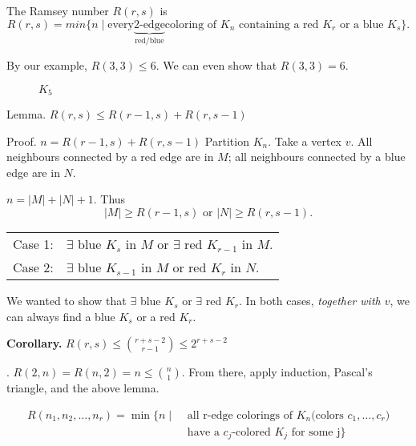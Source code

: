 
\begin{definition}
The Ramsey number $R(r,s)$ is
\[
  R(r,s) =
    min \{n\mid \text{every} \underbrace{\text{2-edge}}_{\text{red/blue}} 
    \text{coloring of $K_n$ containing a red $K_r$ or a blue $K_s$}\}.
\]
\end{definition}

By our example, $R(3,3) ≤ 6$. We can even show that $R(3,3) = 6$.

\begin{figure}[htb]
  \centering
  \caption{$K_5$}
\end{figure}

Lemma. $R(r,s) ≤ R(r-1, s) + R(r, s-1)$

Proof. $n = R(r-1, s) + R(r, s-1)$
Partition $K_n$. Take a vertex $v$. All neighbours connected by a red edge are in $M$; all neighbours connected by a blue edge are in $N$.

$n = |M|+|N|+1$. Thus
\[
  |M| ≥ R(r-1, s) \text{ or } |N| ≥ R(r, s-1).
\]

\begin{tabular}{ll}
  Case 1: & $\exists$ blue $K_s$ in $M$ or $\exists$ red $K_{r-1}$ in $M$. \\
  Case 2: & $\exists$ blue $K_{s-1}$ in $M$ or red $K_r$ in $N$.
\end{tabular}

We wanted to show that $\exists$ blue $K_s$ or $\exists$ red $K_r$.
In both cases, \emph{together with $v$}, we can always find a blue $K_s$ or a red $K_r$.

\textbf{Corollary.} $R(r,s) ≤ {r+s-2 \choose r-1} ≤ 2^{r+s-2}$

\Proof. $R(2,n) = R(n,2) = n ≤ {n \choose 1}$. From there, apply induction, Pascal's triangle, and the above lemma.

\begin{definition}
\begin{align*}
  R(n_1,n_2,\ldots,n_r) = \min \{ n \mid
    &\text{ all r-edge colorings of $K_n$
      (colors $c_1,\ldots,c_r$)} \\
    & \text{ have a $c_j$-colored $K_j$ for some j}\}
\end{align*}
\end{definition}











